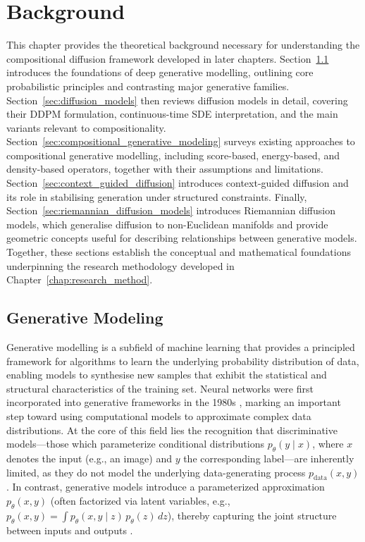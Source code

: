 \chapter{Background}
\label{chap:background}

\noindent
This chapter provides the theoretical background necessary for understanding the
compositional diffusion framework developed in later chapters.  
Section~\ref{sec:deep_generative_models} introduces the foundations of deep
generative modelling, outlining core probabilistic principles and contrasting
major generative families.  
Section~\ref{sec:diffusion_models} then reviews diffusion models in detail,
covering their DDPM formulation, continuous-time SDE interpretation, and the
main variants relevant to compositionality.  
Section~\ref{sec:compositional_generative_modeling} surveys existing approaches
to compositional generative modelling, including score-based, energy-based, and
density-based operators, together with their assumptions and limitations.  
Section~\ref{sec:context_guided_diffusion} introduces context-guided diffusion
and its role in stabilising generation under structured constraints.  
Finally, Section~\ref{sec:riemannian_diffusion_models} introduces Riemannian
diffusion models, which generalise diffusion to non-Euclidean manifolds and
provide geometric concepts useful for describing relationships between
generative models.
Together, these sections establish the conceptual and mathematical foundations
underpinning the research methodology developed in
Chapter~\ref{chap:research_method}.


\section{Generative Modeling}
\label{sec:deep_generative_models}
Generative modelling is a subfield of machine learning that provides a principled framework for algorithms to learn the underlying probability distribution of data, enabling models to synthesise new samples that exhibit the statistical and structural characteristics of the training set. Neural networks were first incorporated into generative frameworks in the 1980s \citep{optimal_perceptual_inference, bond2021deep}, marking an important step toward using computational models to approximate complex data distributions.
At the core of this field lies the recognition that discriminative models—those which parameterize conditional distributions \( p_{\theta}(y \mid x) \), where \( x \) denotes the input (e.g., an image) and \( y \) the corresponding label—are inherently limited, as they do not model the underlying data-generating process \( p_{\text{data}}(x, y) \). In contrast, generative models introduce a parameterized approximation \( p_{\theta}(x, y) \) (often factorized via latent variables, e.g., \( p_{\theta}(x, y) = \!\int\! p_{\theta}(x, y \mid z)\,p_{\theta}(z)\,dz \)), thereby capturing the joint structure between inputs and outputs \citep{tomczak2024deep}.


